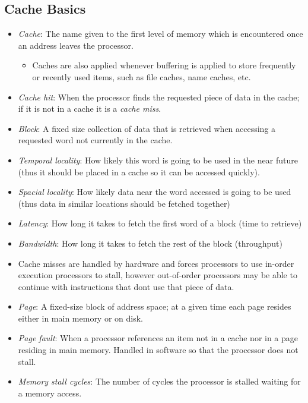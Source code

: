 \subsection{Cache Basics}

\begin{itemize}
  \item \textit{Cache}: The name given to the first level of memory which is encountered once an address leaves the processor. 
  \begin{itemize}
    \item Caches are also applied whenever buffering is applied to store frequently or recently used items, such as file caches, name caches, etc.
  \end{itemize}
  \item \textit{Cache hit}: When the processor finds the requested piece of data in the cache; if it is not in a cache it is a \textit{cache miss}.
  \item \textit{Block}: A fixed size collection of data that is retrieved when accessing a requested word not currently in the cache.
  \item \textit{Temporal locality}: How likely this word is going to be used in the near future (thus it should be placed in a cache so it can be accessed quickly).
  \item \textit{Spacial locality}: How likely data near the word accessed is going to be used (thus data in similar locations should be fetched together)
  \item \textit{Latency}: How long it takes to fetch the first word of a block (time to retrieve)
  \item \textit{Bandwidth}: How long it takes to fetch the rest of the block (throughput)
  \item Cache misses are handled by hardware and forces processors to use in-order execution processors to stall, however out-of-order processors may be able to continue with instructions that dont use that piece of data.
  \item \textit{Page}: A fixed-size block of address space; at a given time each page resides either in main memory or on disk. 
  \item \textit{Page fault}: When a processor references an item not in a cache nor in a page residing in main memory. Handled in software so that the processor does not stall.
  \item \textit{Memory stall cycles}: The number of cycles the processor is stalled waiting for a memory access.
\end{itemize}
